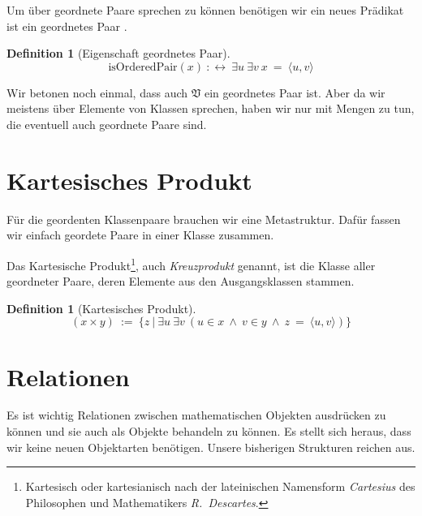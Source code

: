 \documentclass[a4paper,german,10pt,twoside]{book}
\theoremstyle{definition}
\newtheorem{defn}[thm]{Definition}
\theoremstyle{remark}
\begin{document}
\par
Um {\"u}ber geordnete Paare sprechen zu k{\"o}nnen ben{\"o}tigen wir ein neues Pr{\"a}dikat
{\glqq ist ein geordnetes Paar \grqq}.

\begin{defn}[Eigenschaft geordnetes Paar]
\label{definition:isOrderedPair} \hypertarget{definition:isOrderedPair}{}
$$\mbox{isOrderedPair}(x)\ :\leftrightarrow \ \exists u\ \exists v\ x \ =  \ \langle u, v \rangle$$

\end{defn}

Wir betonen noch einmal, dass auch $\mathfrak{V}$ ein geordnetes Paar ist. Aber da
wir meistens {\"u}ber Elemente von Klassen sprechen, haben wir nur mit Mengen zu tun,
die eventuell auch geordnete Paare sind.


\section{Kartesisches Produkt} \label{chapter4_section2} \hypertarget{chapter4_section2}{}
F{\"u}r die geordenten Klassenpaare brauchen wir eine Metastruktur. Daf{\"u}r fassen wir einfach geordete
Paare in einer Klasse zusammen.

\par
Das Kartesische Produkt\footnote{Kartesisch oder kartesianisch nach der 
lateinischen Namensform \emph{Cartesius} des Philosophen und Mathematikers 
\emph{R.~Descartes}.}, auch \emph{Kreuzprodukt} genannt, ist die Klasse 
aller geordneter Paare, deren Elemente aus den Ausgangsklassen stammen.

\begin{defn}[Kartesisches Produkt]
\label{definition:cartesianProduct} \hypertarget{definition:cartesianProduct}{}
$$( x \times y)\ := \ \{ z \ | \ \exists u\ \exists v\ (u \in x\ \land \ v \in y\ \land \ z \ =  \ \langle u, v \rangle) \} $$

\end{defn}




\section{Relationen} \label{chapter4_section3} \hypertarget{chapter4_section3}{}
Es ist wichtig Relationen zwischen mathematischen Objekten
ausdr{\"u}cken zu k{\"o}nnen und sie auch als Objekte behandeln
zu k{\"o}nnen. Es stellt sich heraus, dass wir keine neuen
Objektarten ben{\"o}tigen. Unsere bisherigen Strukturen reichen aus.
\end{document}
